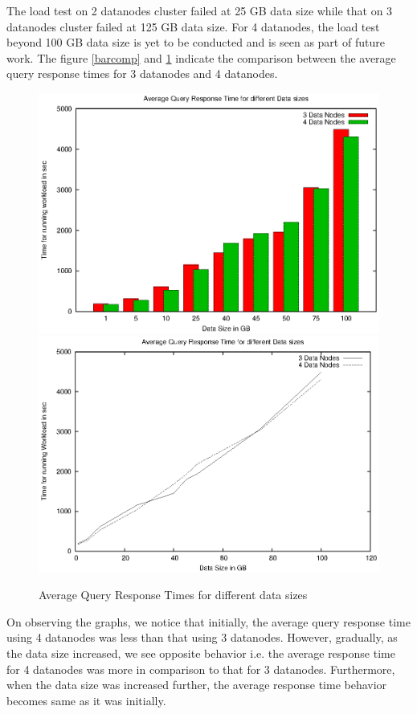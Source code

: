 \documentclass[12pt]{book}
\begin{document}
The load test on 2 datanodes cluster failed at 25 GB data size while that on 3 datanodes cluster failed at 125 GB data size.
For 4 datanodes, the load test beyond 100 GB data size is yet to be conducted and is seen as part of future work.
\newline
\newline
The figure \ref{barcomp} and \ref{linecomp} indicate the comparison between the average query response times for 3 datanodes and 4 datanodes.
\newline
\newline
\begin{figure}[H]
 \centering
 \subfigure
 {
 \includegraphics[width=12cm]{bar_comparison.eps}
 \label{barcomp}
 }
 \subfigure
 {
 \includegraphics[width=12cm]{line_comparison.eps}
 \label{linecomp}
 }
\caption{Average Query Response Times for different data sizes}
\end{figure}

On observing the graphs, we notice that initially, the average query response time using 4 datanodes was less than that using 3 datanodes.
However, gradually, as the data size increased, we see opposite behavior i.e. the average response time for 4 datanodes was more in comparison
to that for 3 datanodes. Furthermore, when the data size was increased further, the average response time behavior becomes same as it was 
initially.
\end{document}
